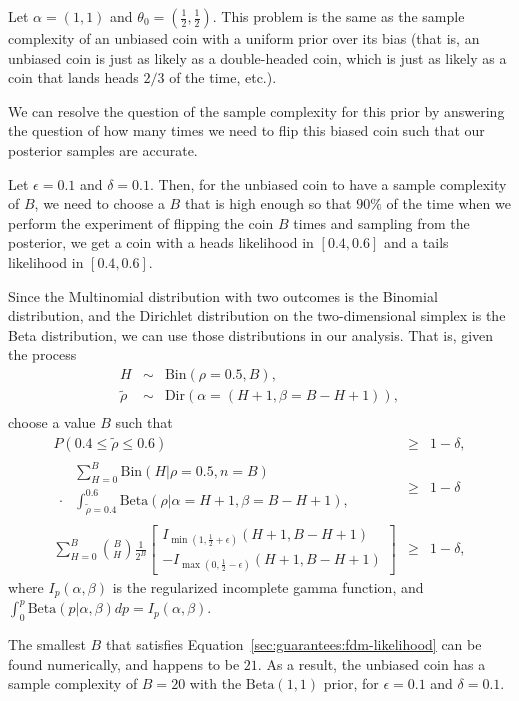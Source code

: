 \begin{example}

Let $\alpha=(1, 1)$ and $\theta_0=(\frac 1 2, \frac 1 2)$. This problem is the same as the sample complexity of an unbiased coin with a uniform prior over its bias (that is, an unbiased coin is just as likely as a double-headed coin, which is just as likely as a coin that lands heads $2/3$ of the time, etc.).

We can resolve the question of the sample complexity for this prior by answering the question of how many times we need to flip this biased coin such that our posterior samples are accurate.

Let $\epsilon = 0.1$ and $\delta = 0.1$. Then, for the unbiased coin to have a sample complexity of $B$, we need to choose a $B$ that is high enough so that $90\%$ of the time when we perform the experiment of flipping the coin $B$ times and sampling from the posterior, we get a coin with a heads likelihood in $[0.4,0.6]$ and a tails likelihood in $[0.4,0.6]$.

Since the Multinomial distribution with two outcomes is the Binomial distribution, and the Dirichlet distribution on the two-dimensional simplex is the Beta distribution, we can use those distributions in our analysis. That is, given the process
\begin{eqnarray}
H &\sim& \mbox{Bin}(\rho=0.5, B),\\
\tilde \rho &\sim& \mbox{Dir}(\alpha=(H+1, \beta=B-H+1)),\\
\end{eqnarray}
choose a value $B$ such that
\begin{eqnarray}
P(0.4\leq \tilde \rho\leq 0.6)&\geq& 1-\delta,\\
%
\begin{array}{ll}
&\sum_{H=0}^B \mbox{Bin}(H|\rho=0.5,n=B)\\
\cdot &\int_{\tilde \rho=0.4}^{0.6} \mbox{Beta}(\rho|\alpha=H+1,\beta=B-H+1),
\end{array}
&\geq& 1-\delta\\
%
\label{sec:guarantees:fdm-likelihood}
\sum_{H=0}^B {B \choose H} \frac 1 {2^B}
\left[
 \begin{array}{l}
  I_{\min({1,{\frac 1 2 + \epsilon}})}(H+1,B-H+1)\\
  -I_{\max({0,{\frac 1 2 - \epsilon}})}(H+1,B-H+1)
 \end{array}
\right]&\geq& 1-\delta,
\end{eqnarray}
where $I_p(\alpha,\beta)$ is the regularized incomplete gamma function, and $\int_0^p\mbox{Beta}(p|\alpha,\beta) dp = I_p(\alpha,\beta)$.

The smallest $B$ that satisfies Equation~\ref{sec:guarantees:fdm-likelihood} can be found numerically, and happens to be $21$. As a result, the unbiased coin has a sample complexity of $B=20$ with the $\mbox{Beta}(1,1)$ prior, for $\epsilon=0.1$ and $\delta=0.1$.

\end{example}

